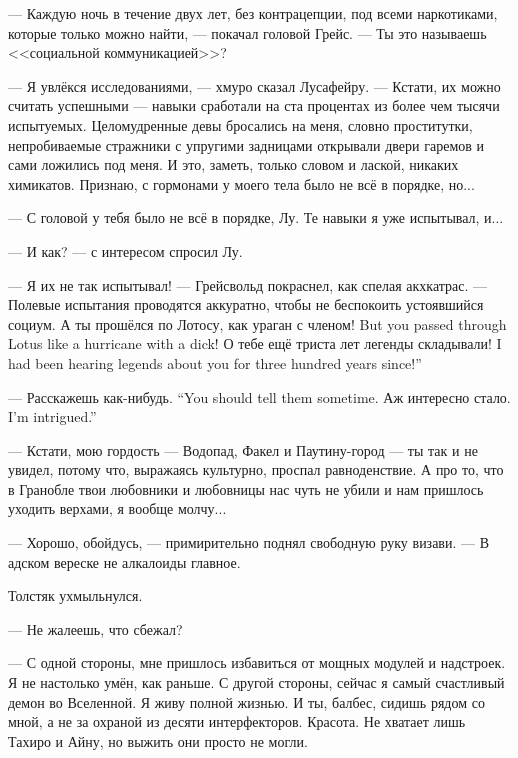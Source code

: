 --- Каждую ночь в течение двух лет, без контрацепции, под всеми наркотиками, которые только можно найти, --- покачал головой Грейс.
--- Ты это называешь <<социальной коммуникацией>>?

--- Я увлёкся исследованиями, --- хмуро сказал Лусафейру.
--- Кстати, их можно считать успешными --- навыки сработали на ста процентах из более чем тысячи испытуемых.
Целомудренные девы бросались на меня, словно проститутки, непробиваемые стражники с упругими задницами открывали двери гаремов и сами ложились под меня.
И это, заметь, только словом и лаской, никаких химикатов.
Признаю, с гормонами у моего тела было не всё в порядке, но...

--- С головой у тебя было не всё в порядке, Лу.
Те навыки я уже испытывал, и...

--- И как? --- с интересом спросил Лу.

--- Я их не так испытывал! --- Грейсвольд покраснел, как спелая акхкатрас.
--- Полевые испытания проводятся аккуратно, чтобы не беспокоить устоявшийся социум.
{А ты прошёлся по Лотосу, как ураган с членом!}
{But you passed through Lotus like a hurricane with a dick!}
{О тебе ещё триста лет легенды складывали!}
{I had been hearing legends about you for three hundred years since!''}

{--- Расскажешь как-нибудь.}
{``You should tell them sometime.}
{Аж интересно стало.}
{I'm intrigued.''}

--- Кстати, мою гордость --- Водопад, Факел и Паутину-город\FM{} --- ты так и не увидел, потому что, выражаясь культурно, проспал равноденствие.
А про то, что в Гранобле твои любовники и любовницы нас чуть не убили и нам пришлось уходить верхами, я вообще молчу...

--- Хорошо, обойдусь, --- примирительно поднял свободную руку визави.
--- В адском вереске не алкалоиды главное.

Толстяк ухмыльнулся.

--- Не жалеешь, что сбежал?

--- С одной стороны, мне пришлось избавиться от мощных модулей и надстроек.
Я не настолько умён, как раньше.
С другой стороны, сейчас я самый счастливый демон во Вселенной.
Я живу полной жизнью.
И ты, балбес, сидишь рядом со мной, а не за охраной из десяти интерфекторов.
Красота.
Не хватает лишь Тахиро и Айну, но выжить они просто не могли.


